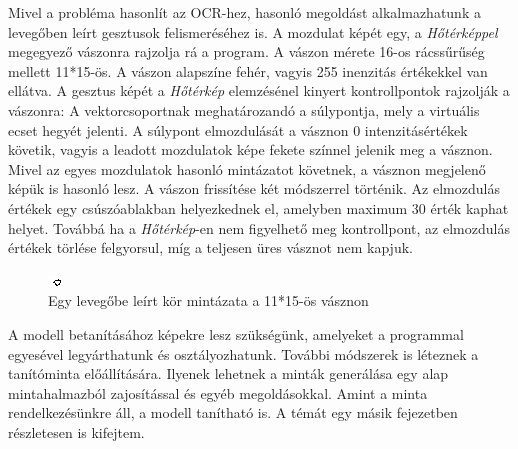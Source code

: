 Mivel a probléma hasonlít az OCR-hez, hasonló megoldást alkalmazhatunk a levegőben leírt gesztusok felismeréséhez is. A mozdulat képét egy, a \textit{Hőtérképpel} megegyező vászonra rajzolja rá a program. A vászon mérete 16-os rácssűrűség mellett 11*15-ös. A vászon alapszíne fehér, vagyis 255 inenzitás értékekkel van ellátva. A gesztus képét a \textit{Hőtérkép} elemzésénel kinyert kontrollpontok rajzolják a vászonra: A vektorcsoportnak meghatározandó a súlypontja, mely a virtuális ecset hegyét jelenti. A súlypont elmozdulását a vásznon 0 intenzitásértékek követik, vagyis a leadott mozdulatok képe fekete színnel jelenik meg a vásznon. Mivel az egyes mozdulatok hasonló mintázatot követnek, a vásznon megjelenő képük is hasonló lesz. A vászon frissítése két módszerrel történik. Az elmozdulás értékek egy csúszóablakban helyezkednek el, amelyben maximum  30 érték kaphat helyet. Továbbá ha a \textit{Hőtérkép}-en nem figyelhető meg kontrollpont, az elmozdulás értékek törlése felgyorsul, míg a teljesen üres vásznot nem kapjuk.

\begin{figure}[h]
\centering
\includegraphics[width=11.2truecm, height=6.3truecm]{images/OCR-Gesture.png}
\caption{Egy levegőbe leírt kör mintázata a 11*15-ös vásznon}
\label{fig:heatmap}
\end{figure}

A modell betanításához képekre lesz szükségünk, amelyeket a programmal egyesével legyárthatunk és osztályozhatunk. További módszerek is léteznek a tanítóminta előállítására. Ilyenek lehetnek a minták generálása egy alap mintahalmazból zajosítással és egyéb megoldásokkal. Amint a minta rendelkezésünkre áll, a modell tanítható is. A témát egy másik fejezetben részletesen is kifejtem.
